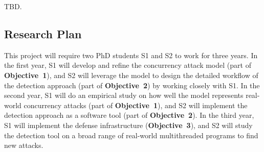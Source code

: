 TBD.

\vspace{-.15in}\subsection{Research Plan} \label{sec:plan}\vspace{-.075in}

This project will require two PhD students S1 and S2 to work for 
three years. In the first year, S1 will develop and refine the concurrency 
attack model (part of \textbf{Objective~1}), and S2 will leverage the model to 
design the detailed workflow of the detection approach (part of 
\textbf{Objective~2}) by working closely with S1. In the second year, S1 will 
do an empirical study on how well the model represents real-world concurrency 
attacks (part of \textbf{Objective~1}), and S2 will implement the detection 
approach as a software tool (part of \textbf{Objective~2}). In the third year, 
S1 will implement the defense infrastructure (\textbf{Objective~3}), and S2 
will study the detection tool on a broad range of real-world multithreaded 
programs to find new attacks.



